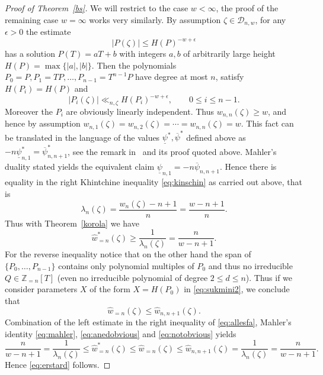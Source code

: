 \documentclass[12pt]{amsart}
\theoremstyle{definition}
\begin{document}
\begin{proof}[Proof of Theorem~\ref{bs}]      
We will restrict to the case $w<\infty$, the proof of the remaining case $w=\infty$ works very similarly.
By assumption $\zeta\in\mathscr{D}_{n,w}$, for any $\epsilon>0$ 
the estimate
%
\[
\vert P(\zeta)\vert \leq H(P)^{-w+\epsilon}
\]
%
has a solution $P(T)=aT+b$ with integers $a,b$ of arbitrarily large height $H(P)=\max\{\vert a\vert, \vert b\vert\}$.
Then the polynomials $P_{0}=P, P_{1}=TP, \ldots, P_{n-1}=T^{n-1}P$ have degree at most $n$, satisfy $H(P_{i})=H(P)$ and 
%
\[
\vert P_{i}(\zeta)\vert \ll_{n,\zeta} H(P_{i})^{-w+\epsilon}, \qquad 0\leq i\leq n-1. 
\]
%
Moreover the $P_{i}$ are obviously linearly independent. Thus $w_{n,n}(\zeta)\geq w$, and hence by assumption
$w_{n,1}(\zeta)=w_{n,2}(\zeta)=\cdots=w_{n,n}(\zeta)=w$. This fact can be translated
in the language of the values $\underline{\psi}^{\ast},\overline{\psi}^{\ast}$ defined above as
$-n\underline{\psi}^{\ast}_{n,1}=\overline{\psi}_{n,n+1}^{\ast}$, see the remark in~\cite{ss} and its proof quoted above.
Mahler's duality stated yields the equivalent claim $\underline{\psi}_{n,1}=-n\overline{\psi}_{n,n+1}$. 
Hence there is equality in the right Khintchine inequality \eqref{eq:kinschin}
as carried out above, that is
%
\[
\lambda_{n}(\zeta)=\frac{w_{n}(\zeta)-n+1}{n}=\frac{w-n+1}{n}.
\]
%
Thus with Theorem~\ref{korola} we have
%
\begin{equation} \label{eq:anedobvious}
\widehat{w}_{=n}^{\ast}(\zeta)\geq \frac{1}{\lambda_{n}(\zeta)}=\frac{n}{w-n+1}.
\end{equation}
%
For the reverse inequality
notice that on the other hand the span of $\{P_{0},\ldots,P_{n-1}\}$
contains only polynomial multiples of $P_{0}$ and thus no irreducible $Q\in \mathbb{Z}_{=n}[T]$ 
(even no irreducible polynomial of degree $2\leq d\leq n$). Thus if
we consider parameters $X$ of the form $X=H(P_{0})$ in \eqref{eq:sukmini2}, we 
conclude that
%
\begin{equation}  \label{eq:notobvious}
\widehat{w}_{=n}(\zeta)\leq \widehat{w}_{n,n+1}(\zeta). 
\end{equation}
%
Combination of the left estimate
in the right inequality of \eqref{eq:allesfa}, Mahler's identity \eqref{eq:mahler},
\eqref{eq:anedobvious} and \eqref{eq:notobvious} yields
%
\[
\frac{n}{w-n+1}= \frac{1}{\lambda_{n}(\zeta)}\leq \widehat{w}_{=n}^{\ast}(\zeta)\leq \widehat{w}_{=n}(\zeta)
\leq \widehat{w}_{n,n+1}(\zeta)=\frac{1}{\lambda_{n}(\zeta)}=\frac{n}{w-n+1}.
\]
%
Hence \eqref{eq:erstard} follows.
\end{proof}
\end{document}
